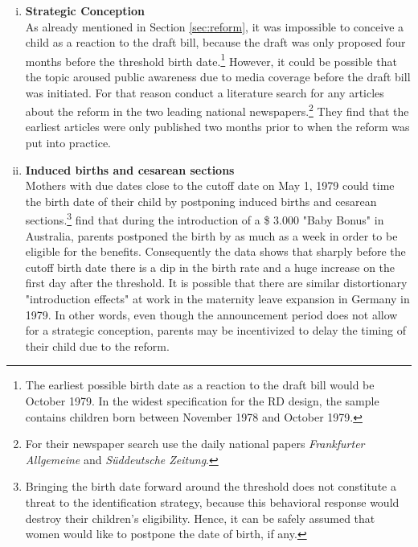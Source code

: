 \documentclass[a4paper ]{article}
\begin{document}
\bigskip
\begin{enumerate}[(i)]
\item \textbf{Strategic Conception}\\ As already mentioned in Section \ref{sec:reform}, it was impossible to conceive a child as a reaction to the draft bill, because the draft was only proposed four months before the threshold birth date.\footnote{The earliest possible birth date as a reaction to the draft bill would be October 1979. In the widest specification for the RD design, the sample contains children born between November 1978 and October 1979.} However, it could be possible that the topic aroused public awareness due to media coverage before the draft bill was initiated. For that reason \cite{dustmann2012expansions} conduct a literature search for any articles about the reform in the two leading national newspapers.\footnote{For their newspaper search \cite{dustmann2012expansions} use the daily national papers \emph{Frankfurter Allgemeine} and \emph{Süddeutsche Zeitung}.} They find that the earliest articles were only published two months prior to when the reform was put into practice.

\bigskip
\item \textbf{Induced births and cesarean sections}\\ Mothers with due dates close to the cutoff date on May 1, 1979 could time the birth date of their child by postponing induced births and cesarean sections.\footnote{Bringing the birth date forward around the threshold does not constitute a threat to the identification strategy, because this behavioral response would destroy their children's eligibility. Hence, it can be safely assumed that women would like to postpone the date of birth, if any.} \cite{gans2009born} find that during the introduction of a \$ 3.000 "Baby Bonus" in Australia, parents postponed the birth by as much as a week in order to be eligible for the benefits. Consequently the data shows that sharply before the cutoff birth date there is a dip in the birth rate and a huge increase on the first day after the threshold.\newline
It is possible that there are similar distortionary "introduction effects" at work in the maternity leave expansion in Germany in 1979. In other words, even though the announcement period does not allow for a strategic conception, parents may be incentivized to delay the timing of their child due to the reform. 
\end{enumerate}
\end{document}
